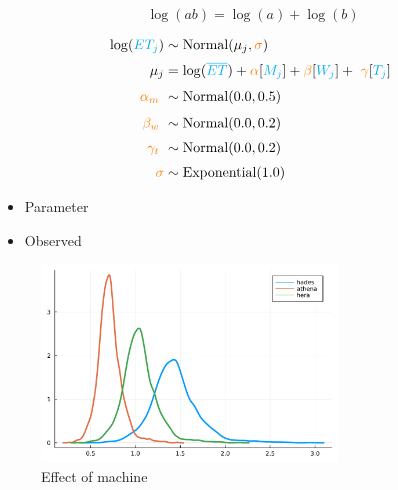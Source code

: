 \documentclass[aspectratio=169,xcolor=svgnames]{beamer}
\begin{document}
\begin{frame}
  \begin{equation*}
    \log(ab) = \log(a) + \log(b)
  \end{equation*}
\end{frame}

\begin{frame}[fragile]
  \begin{align*}
    \log(\observed{ET_j}) &\sim \text{Normal}(\mu_j, \parameter{\sigma})\\
    \mu_j &= \log(\observed{\overline{ET}}) + \parameter{\alpha}[\observed{M_j}] + \parameter{\beta}[\observed{W_j}] + \markmath{arrayaccess}{\parameter{\gamma}[\observed{T_j}]}\\
    \markmath{alpha}{\parameter{\alpha_m}} &\sim \normal{0.0, 0.5}\\
    \markmath{beta}{\parameter{\beta_w}} &\sim \normal{0.0, 0.2}\\
    \markmath{gamma}{\parameter{\gamma_t}} &\sim \normal{0.0, 0.2}\\
    \parameter{\sigma} &\sim \exponential{1.0}\\
  \end{align*}

  \begin{itemize}
  \item {} Parameter
  \item {} Observed
  \end{itemize}
\end{frame}

\begin{frame}
  \begin{figure}[ht]
    \centering
    \includegraphics[width=0.7\textwidth]{figures/plot_family_distribution_bloat.pdf}
    \caption{Effect of machine}
  \end{figure}
\end{frame}
\end{document}
